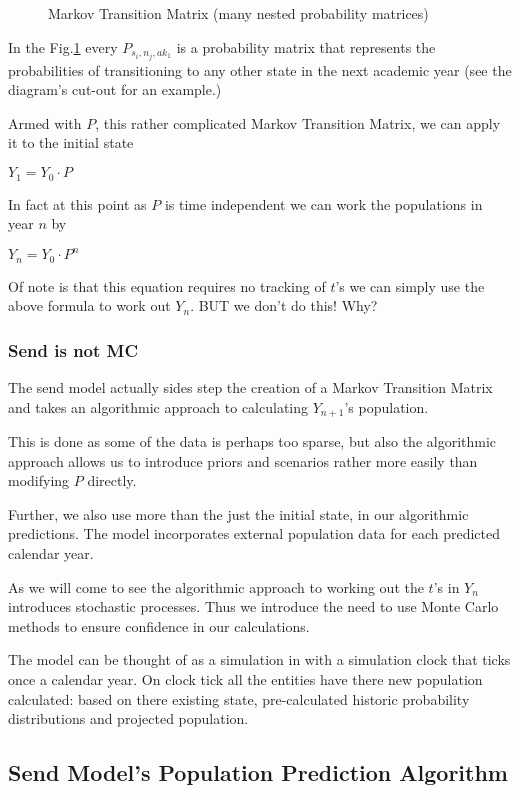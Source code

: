 \documentclass[margin=5mm]{article}
\begin{document}
\begin{figure}[h!]
  \caption{Markov Transition Matrix (many nested probability
    matrices)\label{transition matrix}
  }
\end{figure}

In the Fig.\ref{transition matrix} every $P_{s_i,n_j,ak_1}$ is a
probability matrix that represents the probabilities of transitioning
to any other state in the next academic year (see the diagram's
cut-out for an example.)

Armed with $P$, this rather complicated Markov Transition Matrix, we can
apply it to the initial state

$Y_1 = Y_0 \cdot P$

In fact at this point as $P$ is time independent we can work the
populations in year $n$ by

$Y_n = Y_0 \cdot P^n$

Of note is that this equation requires no tracking of $t$'s we can
simply use the above formula to work out $Y_n$. BUT we don't do this!
Why?

\subsubsection{Send is not MC}

The send model actually sides step the creation of a Markov Transition
Matrix and takes an algorithmic approach to calculating $Y_{n+1}$'s
population.

This is done as some of the data is perhaps too sparse, but also the
algorithmic approach allows us to introduce priors and scenarios
rather more easily than modifying $P$ directly.

Further, we also use more than the just the initial state, in our
algorithmic predictions.  The model incorporates external population
data for each predicted calendar year.

As we will come to see the algorithmic approach to working out the
$t$'s in $Y_n$ introduces stochastic processes. Thus we introduce the
need to use Monte Carlo methods to ensure confidence in our
calculations.

The model can be thought of as a simulation in with a simulation clock
that ticks once a calendar year. On clock tick all the entities have
there new population calculated: based on there existing state,
pre-calculated historic probability distributions and projected
population.

\subsection{Send Model's Population Prediction Algorithm}
\end{document}
